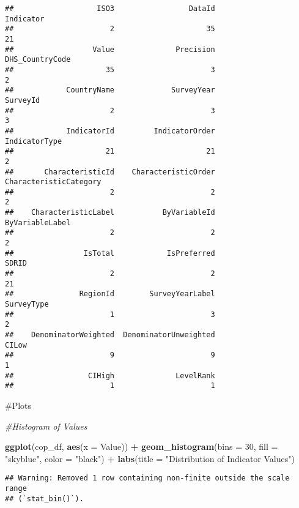 \documentclass[
]{article}
\newenvironment{Shaded}{\begin{snugshade}}{\end{snugshade}}
\newcommand{\AttributeTok}[1]{\textcolor[rgb]{0.13,0.29,0.53}{#1}}
\newcommand{\CommentTok}[1]{\textcolor[rgb]{0.56,0.35,0.01}{\textit{#1}}}
\newcommand{\DecValTok}[1]{\textcolor[rgb]{0.00,0.00,0.81}{#1}}
\newcommand{\FunctionTok}[1]{\textcolor[rgb]{0.13,0.29,0.53}{\textbf{#1}}}
\newcommand{\NormalTok}[1]{#1}
\newcommand{\SpecialCharTok}[1]{\textcolor[rgb]{0.81,0.36,0.00}{\textbf{#1}}}
\newcommand{\StringTok}[1]{\textcolor[rgb]{0.31,0.60,0.02}{#1}}
\begin{document}
\begin{verbatim}
##                   ISO3                 DataId              Indicator 
##                      2                     35                     21 
##                  Value              Precision        DHS_CountryCode 
##                     35                      3                      2 
##            CountryName             SurveyYear               SurveyId 
##                      2                      3                      3 
##            IndicatorId         IndicatorOrder          IndicatorType 
##                     21                     21                      2 
##       CharacteristicId    CharacteristicOrder CharacteristicCategory 
##                      2                      2                      2 
##    CharacteristicLabel           ByVariableId        ByVariableLabel 
##                      2                      2                      2 
##                IsTotal            IsPreferred                  SDRID 
##                      2                      2                     21 
##               RegionId        SurveyYearLabel             SurveyType 
##                      1                      3                      2 
##    DenominatorWeighted  DenominatorUnweighted                  CILow 
##                      9                      9                      1 
##                 CIHigh              LevelRank 
##                      1                      1
\end{verbatim}

\#Plots

\begin{Shaded}
\begin{Highlighting}[]
\CommentTok{\#Histogram of Values}

\FunctionTok{ggplot}\NormalTok{(cop\_df, }\FunctionTok{aes}\NormalTok{(}\AttributeTok{x =}\NormalTok{ Value)) }\SpecialCharTok{+}
\FunctionTok{geom\_histogram}\NormalTok{(}\AttributeTok{bins =} \DecValTok{30}\NormalTok{, }\AttributeTok{fill =} \StringTok{"skyblue"}\NormalTok{, }\AttributeTok{color =} \StringTok{"black"}\NormalTok{) }\SpecialCharTok{+}
  \FunctionTok{labs}\NormalTok{(}\AttributeTok{title =} \StringTok{"Distribution of Indicator Values"}\NormalTok{)}
\end{Highlighting}
\end{Shaded}

\begin{verbatim}
## Warning: Removed 1 row containing non-finite outside the scale range
## (`stat_bin()`).
\end{verbatim}
\end{document}
